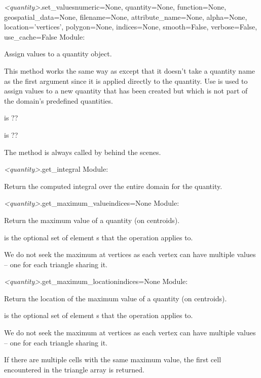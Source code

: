 \documentclass{manual}
\begin{document}
\begin{methoddesc}{\emph{<quantity>}.set_values}{numeric=None,
                               quantity=None,
                               function=None,
                               geospatial_data=None,
                               filename=None,
                               attribute_name=None,
                               alpha=None,
                               location='vertices',
                               polygon=None,
                               indices=None,
                               smooth=False,
                               verbose=False,
                               use_cache=False}
Module: 

Assign values to a quantity object.

This method works the same way as  except that it doesn't take
a quantity name as the first argument since it is applied directly to the quantity.
Use  is used to assign
values to a new quantity that has been created but which is
not part of the domain's predefined quantities.

 is ??

 is ??

The method  is always called by 
behind the scenes.
\end{methoddesc}

\begin{methoddesc}{\emph{<quantity>}.get_integral}{}
Module: 

Return the computed integral over the entire domain for the quantity.
\end{methoddesc}

\begin{methoddesc}{\emph{<quantity>}.get_maximum_value}{indices=None}
Module: 

Return the maximum value of a quantity (on centroids).

 is the optional set of element s that
the operation applies to.

We do not seek the maximum at vertices as each vertex can
have multiple values -- one for each triangle sharing it.
\end{methoddesc}

\begin{methoddesc}{\emph{<quantity>}.get_maximum_location}{indices=None}
Module: 

Return the location of the maximum value of a quantity (on centroids).

 is the optional set of element s that
the operation applies to.

We do not seek the maximum at vertices as each vertex can
have multiple values -- one for each triangle sharing it.

If there are multiple cells with the same maximum value, the
first cell encountered in the triangle array is returned.
\end{methoddesc}
\end{document}
